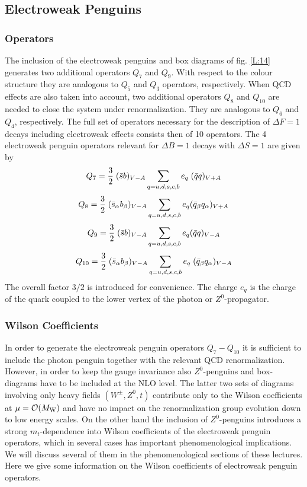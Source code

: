 \documentclass[12pt,rotate]{article}
\newcommand{\mw}{M_{\rm W}}
\newcommand{\be}{\begin{equation}}
\newcommand{\ee}{\end{equation}}
\newcommand{\ord}{{\cal O}}
\begin{document}
\begin{itemize}
\begin{itemize}
\subsection{Electroweak Penguins}
\subsubsection{Operators}
The inclusion of the electroweak penguins and box diagrams of 
fig. \ref{L:14}
generates two additional operators $Q_7$ and $Q_9$. With respect to
the colour structure they are analogous to $Q_5$ and $Q_3$ operators,
respectively. When QCD effects are also taken into account, two
additional operators $Q_8$ and $Q_{10}$ are needed to close the system
under renormalization. They are analogous to $Q_6$ and $Q_4$, respectively.
The full set of operators necessary for the description of
$\Delta F=1$ decays including electroweak effects consists 
then of 10 operators.
The 4 electroweak penguin operators relevant for $\Delta B=1$ decays
with $\Delta S=1$ are given by
\begin{equation}\label{O4} 
Q_7 = {3\over 2}\;(\bar s b)_{V-A}\sum_{q=u,d,s,c,b}e_q\;(\bar qq)_{V+A} 
\ee
\be\label{O4a}
 Q_8 = {3\over2}\;(\bar s_{\alpha} b_{\beta})_{V-A}\sum_{q=u,d,s,c,b}e_q
        (\bar q_{\beta} q_{\alpha})_{V+A}
\end{equation}
\begin{equation}\label{O5} 
 Q_9 = {3\over 2}\;(\bar s b)_{V-A}\sum_{q=u,d,s,c,b}e_q(\bar q q)_{V-A}
\ee
\be\label{O6}
Q_{10} ={3\over 2}\;
(\bar s_{\alpha} b_{\beta})_{V-A}\sum_{q=u,d,s,c,b}e_q\;
       (\bar q_{\beta}q_{\alpha})_{V-A} 
\end{equation}
The overall factor $3/2$ is introduced for convenience. The charge
$e_q$ is the charge of the quark coupled to the lower vertex of the
photon or $Z^0$-propagator.
\subsubsection{Wilson Coefficients}
In order to generate the electroweak penguin operators $Q_7-Q_{10}$
it is sufficient to include the photon penguin together with the
relevant QCD renormalization. However, in order to keep the gauge
invariance also $Z^0$-penguins and box-diagrams have to be included
at the NLO level. The latter two sets of diagrams involving only
heavy fields $(W^\pm,Z^0,t)$ contribute only to the Wilson coefficients
at $\mu=\ord(\mw)$ and have no impact on the renormalization group
evolution down to low energy scales. On the other hand the inclusion
of $Z^0$-penguins introduces a strong $m_t$-dependence into Wilson
coefficients of the electroweak penguin operators, which in several
cases has important phenomenological implications. We will discuss
several of them in the phenomenological sections of these lectures. 
Here we
give some information on the Wilson coefficients of electroweak
penguin operators.


\end{itemize}
\end{itemize}
\end{document}

